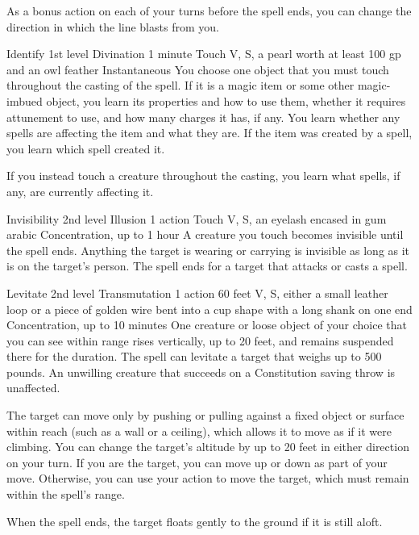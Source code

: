 \documentclass[10pt,a4paper,twoside,bg=print,twocolumn,openany,nodeprecatedcode]{dndbook}
\begin{document}
As a bonus action on each of your turns before the spell ends, you can change the direction in which the line blasts from you.



\DndSpellHeader%
{Identify}
{1st level Divination}
{1 minute}
{Touch}
{V, S, a pearl worth at least 100 gp and an owl feather}
{Instantaneous}
You choose one object that you must touch throughout the casting of the spell. If it is a magic item or some other magic-imbued object, you learn its properties and how to use them, whether it requires attunement to use, and how many charges it has, if any. You learn whether any spells are affecting the item and what they are. If the item was created by a spell, you learn which spell created it.

If you instead touch a creature throughout the casting, you learn what spells, if any, are currently affecting it.



\DndSpellHeader%
{Invisibility}
{2nd level Illusion}
{1 action}
{Touch}
{V, S, an eyelash encased in gum arabic}
{Concentration, up to 1 hour}
A creature you touch becomes invisible until the spell ends. Anything the target is wearing or carrying is invisible as long as it is on the target's person. The spell ends for a target that attacks or casts a spell.



\DndSpellHeader%
{Levitate}
{2nd level Transmutation}
{1 action}
{60 feet}
{V, S, either a small leather loop or a piece of golden wire bent into a cup shape with a long shank on one end}
{Concentration, up to 10 minutes}
One creature or loose object of your choice that you can see within range rises vertically, up to 20 feet, and remains suspended there for the duration. The spell can levitate a target that weighs up to 500 pounds. An unwilling creature that succeeds on a Constitution saving throw is unaffected.

The target can move only by pushing or pulling against a fixed object or surface within reach (such as a wall or a ceiling), which allows it to move as if it were climbing. You can change the target's altitude by up to 20 feet in either direction on your turn. If you are the target, you can move up or down as part of your move. Otherwise, you can use your action to move the target, which must remain within the spell's range.

When the spell ends, the target floats gently to the ground if it is still aloft.
\end{document}
